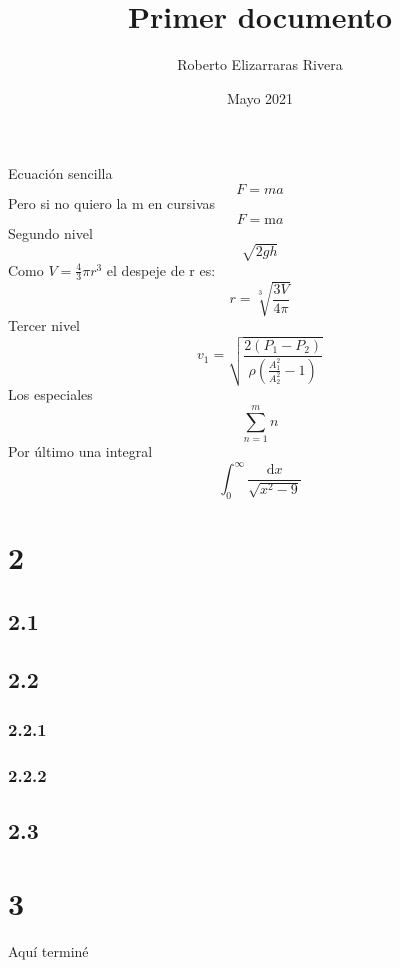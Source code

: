 \documentclass{article}
\title{Primer documento}
\author{Roberto Elizarraras Rivera}
\date{Mayo 2021}
\begin{document}
\maketitle
Ecuación sencilla
\begin{equation}
F=ma
\end{equation}
Pero si no quiero la m en cursivas
\begin{equation}
F=\mathrm{m}a
\end{equation}
Segundo nivel
\begin{equation}
\sqrt{2gh}
\end{equation}
Como $V=\frac{4}{3}\pi r^3$ el despeje de r es:
\begin{equation}
r=\sqrt[3]{\frac{3V}{4\pi}}
\end{equation}
Tercer nivel
\begin{equation}
v_1=\sqrt{\frac{2(P_1-P_2)}{\rho(\frac{A_1^2}{A_2^2}-1)}}
\end{equation}
Los especiales
\begin{equation}
\sum_{n=1}^{m}n
\end{equation}
Por último una integral
\begin{equation}
\int_{0}^{\infty}\frac{\mathrm{d}x}{\sqrt{x^2-9}}
\end{equation}
\section{2}
\subsection{2.1}
\subsection{2.2}
\subsubsection{2.2.1}
\subsubsection{2.2.2}
\subsection{2.3}
\section{3}
Aquí terminé
\end{document}

